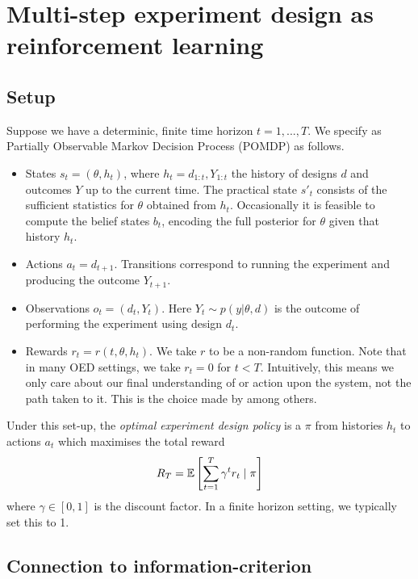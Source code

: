\section{Multi-step experiment design as reinforcement learning}
\label{sec:oedasrl}
\subsection{Setup}
Suppose we have a determinic, finite time horizon $t=1, ..., T$. We specify as Partially Observable Markov Decision Process (POMDP) as follows.
\begin{itemize}
\item States $s_t = (\theta, h_t)$, where $h_t = d_{1:t}, Y_{1:t}$ the history of designs $d$ and outcomes $Y$ up to the current time. The practical state $s'_t$ consists of the sufficient statistics for $\theta$ obtained from $h_t$. Occasionally it is feasible to compute the belief states $b_t$, encoding the full posterior for $\theta$ given that history $h_t$.
\item Actions $a_t = d_{t+1}$. Transitions correspond to running the experiment and producing the outcome $Y_{t+1}$.
\item Observations $o_t = (d_t, Y_t)$. Here $Y_t \sim p(y | \theta, d)$ is the outcome of performing the experiment using design $d_t$.
\item Rewards $r_t = r(t, \theta, h_t)$. We take $r$ to be a non-random function. Note that in many OED settings, we take $r_t = 0$ for $t<T$. Intuitively, this means we only care about our final understanding of or action upon the system, not the path taken to it. This is the choice made by \cite{gonzalez2016} among others.
\end{itemize}
Under this set-up, the \textit{optimal experiment design policy} is a $\pi$ from histories $h_t$ to actions $a_t$ which maximises the total reward
\begin{equation}
	R_T = \mathbb{E} \left[ \sum_{t=1}^T \gamma^t r_t \mid \pi \right]
\end{equation}
where $\gamma \in [0,1]$ is the discount factor. In a finite horizon setting, we typically set this to 1.


\subsection{Connection to information-criterion}
